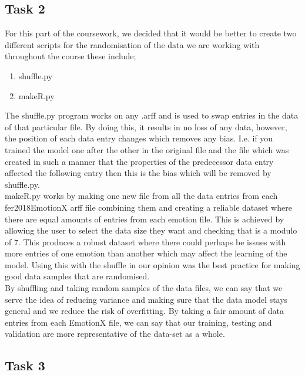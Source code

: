 \documentclass[12pt]{article}
\begin{document}
\subsection{Task 2}

For this part of the coursework, we decided that it would be better to create two different scripts for the randomisation of the data we are working with throughout the course these include;

\begin{enumerate}
	\item shuffle.py
	\item makeR.py
\end{enumerate}

The shuffle.py program works on any .arff and is used to swap entries in the data of that particular file. By doing this, it results in no loss of any data, however, the position of each data entry changes which removes any bias. I.e. if you trained the model one after the other in the original file and the file which was created in such a manner that the properties of the predecessor data entry affected the following entry then this is the bias which will be removed by shuffle.py.\\

makeR.py works by making one new file from all the data entries from each fer2018EmotionX arff file combining them and creating a reliable dataset where there are equal amounts of entries from each emotion file. This is achieved by allowing the user to select the data size they want and checking that is a modulo of 7. This produces a robust dataset where there could perhaps be issues with more entries of one emotion than another which may affect the learning of the model. Using this with the shuffle in our opinion was the best practice for making good data samples that are randomised.\\

By shuffling and taking random samples of the data files, we can say that we serve the idea of reducing variance and making sure that the data model stays general and we reduce the risk of overfitting. By taking a fair amount of data entries from each EmotionX file, we can say that our training, testing and validation are more representative of the data-set as a whole.\\

\newpage

\subsection{Task 3}
\end{document}
